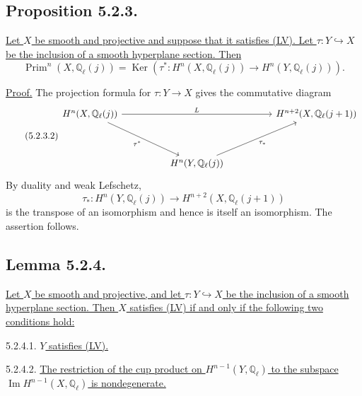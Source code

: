 \subsection*{Proposition 5.2.3.}
\underline{Let $X$ be smooth and projective and suppose that it satisfies
(LV).  Let $\tau:Y\hookrightarrow X$ be the inclusion of a smooth hyperplane
section.  Then}
\begin{equation}\tag{5.2.3.1}
\operatorname{Prim}^n(X,\mathbb Q_\ell(j))
=\operatorname{Ker}\!\left(
\tau^*:H^n(X,\mathbb Q_\ell(j))
\longrightarrow H^n(Y,\mathbb Q_\ell(j))
\right).
\end{equation}

\underline{Proof.}
The projection formula for $\tau:Y\to X$ gives the commutative diagram
\begin{equation}\tag{5.2.3.2}
\begin{tikzcd}[column sep=huge,row sep=huge]
H^n(X,\mathbb Q_\ell(j))
  \arrow[rr,"L"]\arrow[dr,"\tau^*"']
  & {} &
H^{n+2}(X,\mathbb Q_\ell(j+1))\\
{} & H^n(Y,\mathbb Q_\ell(j)) \arrow[ur,"\tau_*"'] & {}
\end{tikzcd}
\end{equation}
By duality and weak Lefschetz,
\[
\tau_*:H^n(Y,\mathbb Q_\ell(j))
\longrightarrow H^{n+2}(X,\mathbb Q_\ell(j+1))
\]
is the transpose of an isomorphism and hence is itself an isomorphism.  The
assertion follows.

\subsection*{Lemma 5.2.4.}
\underline{Let $X$ be smooth and projective, and let
$\tau:Y\hookrightarrow X$ be the inclusion of a smooth hyperplane section.
Then $X$ satisfies (LV) if and only if the following two conditions hold:}

\smallskip
\noindent
\textup{5.2.4.1.} \underline{$Y$ satisfies (LV).}

\smallskip
\noindent
\textup{5.2.4.2.} \underline{The restriction of the cup product on
$H^{n-1}(Y,\mathbb Q_\ell)$ to the subspace
$\operatorname{Im}H^{n-1}(X,\mathbb Q_\ell)$ is nondegenerate.}

